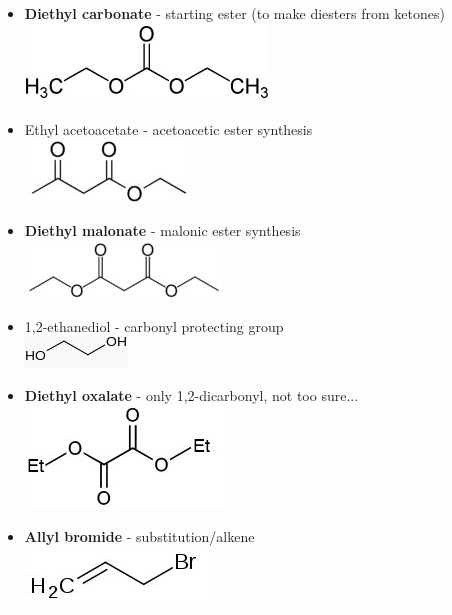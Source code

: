 \documentclass[10pt,landscape]{article}
\begin{document}
\begin{multicols*}{3}
\begin{scriptsize}
    \begin{itemize}
    \item \textbf{Diethyl carbonate} - starting ester (to make
      diesters from ketones)\\
      \includegraphics[scale=0.25]{allowed/diethylcarbonate.jpg}
    \item Ethyl acetoacetate - acetoacetic ester synthesis\\
      \includegraphics[scale=0.25]{allowed/ethylacetoacetate.jpg}
    \item \textbf{Diethyl malonate} - malonic ester synthesis\\
      \includegraphics[scale=0.25]{allowed/diethylmalonate.jpg}
    \item 1,2-ethanediol - carbonyl protecting group\\
      \includegraphics[scale=0.25]{allowed/1,2-ethanediol.jpg}
    \item \textbf{Diethyl oxalate} - only 1,2-dicarbonyl, not too sure... 
      \includegraphics[scale=0.25]{allowed/diethyloxalate.jpg}
    \item \textbf{Allyl bromide} - substitution/alkene\\
      \includegraphics[scale=0.25]{allowed/allylbr.jpg}

\end{itemize}
\end{scriptsize}
\end{multicols*}
\end{document}
